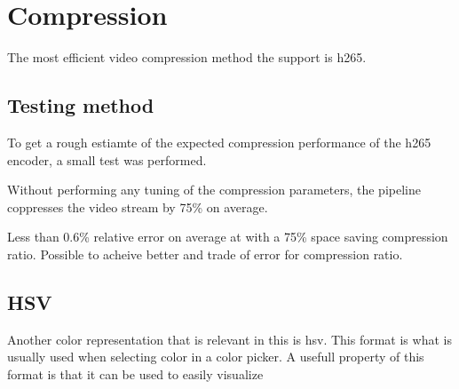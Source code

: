 \section{Compression}



The most efficient video compression method the \jx support is \gls{h265}.

\subsection{Testing method}
To get a rough estiamte of the expected compression performance of the \gls{h265} encoder, a small test was performed.






Without performing any tuning of the compression parameters, the pipeline coppresses the video stream by 75\% on average.


Less than 0.6\% relative error on average at with a 75\% space saving compression ratio.
Possible to acheive better and trade of error for compression ratio.

\subsection{HSV}
Another color representation that is relevant in this \master is \gls{hsv}.
This format is what is usually used when selecting color in a color picker.
A usefull property of this format is that it can be used to easily visualize